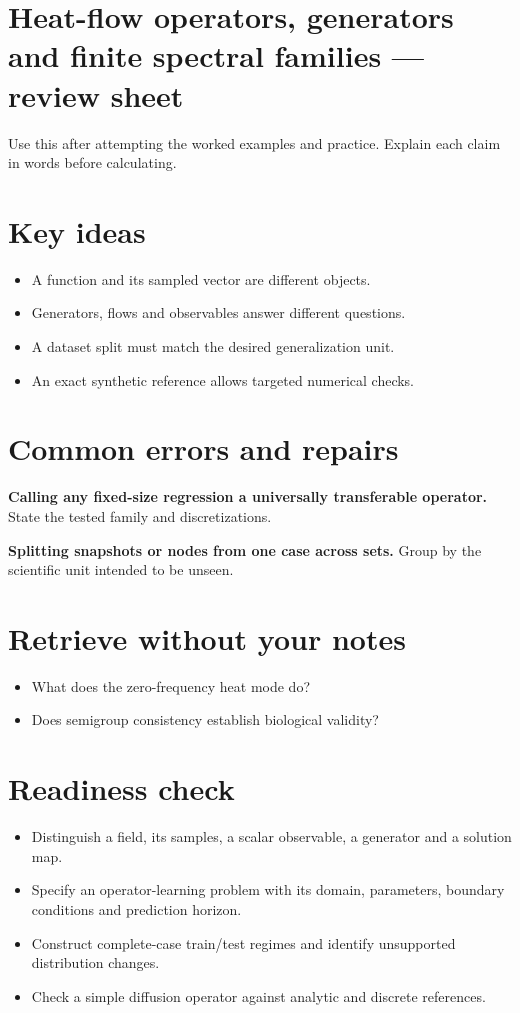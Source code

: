 \documentclass[11pt,letterpaper]{article}
\theoremstyle{definition}\newtheorem{definition}{Definition}\newtheorem{example}{Example}
\numberwithin{equation}{section}
\begin{document}
\section*{Heat-flow operators, generators and finite spectral families --- review sheet}
Use this after attempting the worked examples and practice. Explain each claim in words before calculating.

\section*{Key ideas}
\begin{itemize}
\item A function and its sampled vector are different objects.
\item Generators, flows and observables answer different questions.
\item A dataset split must match the desired generalization unit.
\item An exact synthetic reference allows targeted numerical checks.
\end{itemize}
\section*{Common errors and repairs}
\textbf{Calling any fixed-size regression a universally transferable operator.} State the tested family and discretizations.

\textbf{Splitting snapshots or nodes from one case across sets.} Group by the scientific unit intended to be unseen.

\section*{Retrieve without your notes}
\begin{itemize}
\item What does the zero-frequency heat mode do?
\item Does semigroup consistency establish biological validity?
\end{itemize}
\section*{Readiness check}
\begin{itemize}
\item Distinguish a field, its samples, a scalar observable, a generator and a solution map.
\item Specify an operator-learning problem with its domain, parameters, boundary conditions and prediction horizon.
\item Construct complete-case train/test regimes and identify unsupported distribution changes.
\item Check a simple diffusion operator against analytic and discrete references.
\end{itemize}
\end{document}
